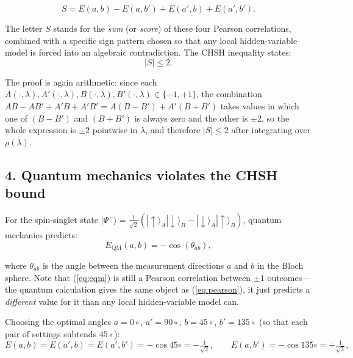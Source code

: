 \begin{equation}
  S = E(a,b) - E(a,b') + E(a',b) + E(a',b').
  \label{eq:S}
\end{equation}

The letter $S$ stands for the \textit{sum} (or \textit{score}) of these four Pearson correlations, combined with a specific sign pattern chosen so that any local hidden-variable model is forced into an algebraic contradiction. The CHSH inequality states:
\begin{equation}
  |S| \leq 2.
  \label{eq:chsh-supp}
\end{equation}

The proof is again arithmetic: since each $A(\cdot,\lambda), A'(\cdot,\lambda), B(\cdot,\lambda), B'(\cdot,\lambda) \in \{-1,+1\}$, the combination $AB - AB' + A'B + A'B' = A(B-B') + A'(B+B')$ takes values in which one of $(B - B')$ and $(B + B')$ is always zero and the other is $\pm2$, so the whole expression is $\pm2$ pointwise in $\lambda$, and therefore $|S| \leq 2$ after integrating over $\rho(\lambda)$.

\subsection*{4. Quantum mechanics violates the CHSH bound}

For the spin-singlet state $|\Psi^-\rangle = \frac{1}{\sqrt{2}} (|\uparrow\rangle_A|\downarrow\rangle_B - |\downarrow\rangle_A|\uparrow\rangle_B)$, quantum mechanics predicts:
\begin{equation}
  E_{\mathrm{QM}}(a,b) = -\cos(\theta_{ab}),
  \label{eq:eqm}
\end{equation}

where $\theta_{ab}$ is the angle between the measurement directions $a$ and $b$ in the Bloch sphere. Note that (\ref{eq:eqm}) is still a Pearson correlation between $\pm1$ outcomes---the quantum calculation gives the same object as (\ref{eq:pearson}), it just predicts a \textit{different} value for it than any local hidden-variable model can.

\medskip

Choosing the optimal angles $a = 0\circ$, $a' = 90\circ$, $b = 45\circ$, $b' = 135\circ$ (so that each pair of settings subtends $45\circ$):
\begin{equation}
  E(a,b) = E(a',b) = E(a',b') = -\cos 45\circ = -\tfrac{1}{\sqrt{2}}, \qquad  E(a,b') = -\cos 135\circ = +\tfrac{1}{\sqrt{2}},
\end{equation}

